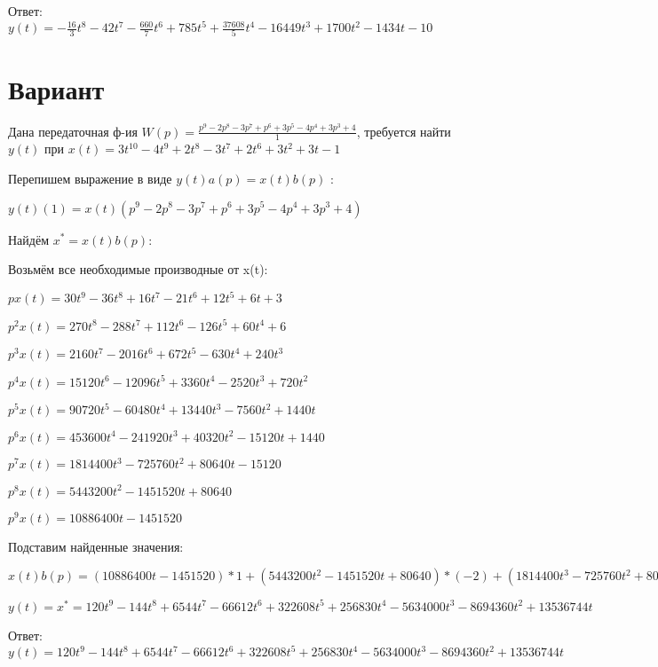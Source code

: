 \documentclass{article}
\begin{document}
Ответ: $y(t) = -\frac{16}{3}t^{8}-42t^{7}-\frac{660}{7}t^{6}+785t^{5}+\frac{37608}{5}t^{4}-16449t^{3}+1700t^{2}-1434t-10$

\section{Вариант}

Дана передаточная ф-ия $W(p)=\frac{p^{9}-2p^{8}-3p^{7}+p^{6}+3p^{5}-4p^{4}+3p^{3}+4}{1}$, требуется найти $y(t)$ при $x(t)=3t^{10}-4t^{9}+2t^{8}-3t^{7}+2t^{6}+3t^{2}+3t-1$

Перепишем выражение в виде $y(t)a(p)=x(t)b(p)$ :

$y(t)(1)=x(t)(p^{9}-2p^{8}-3p^{7}+p^{6}+3p^{5}-4p^{4}+3p^{3}+4)$

Найдём $x^*=x(t)b(p)$:

Возьмём все необходимые производные от x(t):

$px(t)=30t^{9}-36t^{8}+16t^{7}-21t^{6}+12t^{5}+6t+3$

$p^2x(t)=270t^{8}-288t^{7}+112t^{6}-126t^{5}+60t^{4}+6$

$p^3x(t)=2160t^{7}-2016t^{6}+672t^{5}-630t^{4}+240t^{3}$

$p^4x(t)=15120t^{6}-12096t^{5}+3360t^{4}-2520t^{3}+720t^{2}$

$p^5x(t)=90720t^{5}-60480t^{4}+13440t^{3}-7560t^{2}+1440t$

$p^6x(t)=453600t^{4}-241920t^{3}+40320t^{2}-15120t+1440$

$p^7x(t)=1814400t^{3}-725760t^{2}+80640t-15120$

$p^8x(t)=5443200t^{2}-1451520t+80640$

$p^9x(t)=10886400t-1451520$

Подставим найденные значения:

$x(t)b(p) = (10886400t-1451520)*1+(5443200t^{2}-1451520t+80640)*(-2)+(1814400t^{3}-725760t^{2}+80640t-15120)*(-3)+(453600t^{4}-241920t^{3}+40320t^{2}-15120t+1440)*1+(90720t^{5}-60480t^{4}+13440t^{3}-7560t^{2}+1440t)*3+(15120t^{6}-12096t^{5}+3360t^{4}-2520t^{3}+720t^{2})*(-4)+(2160t^{7}-2016t^{6}+672t^{5}-630t^{4}+240t^{3})*3+(30t^{9}-36t^{8}+16t^{7}-21t^{6}+12t^{5}+6t+3)*4=120t^{9}-144t^{8}+6544t^{7}-66612t^{6}+322608t^{5}+256830t^{4}-5634000t^{3}-8694360t^{2}+13536744t$





$y(t)=x^*=120t^{9}-144t^{8}+6544t^{7}-66612t^{6}+322608t^{5}+256830t^{4}-5634000t^{3}-8694360t^{2}+13536744t$

Ответ: $y(t) = 120t^{9}-144t^{8}+6544t^{7}-66612t^{6}+322608t^{5}+256830t^{4}-5634000t^{3}-8694360t^{2}+13536744t$
\end{document}
